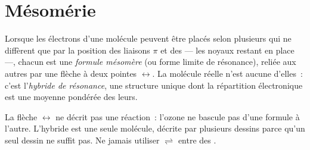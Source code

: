 \section{Mésomérie}

\begin{definition}\label{def:b1:lewis-resonance-vsepr:resonance}
Lorsque les électrons d'une molécule peuvent être placés selon plusieurs
 qui ne diffèrent que par la position des liaisons $\pi$
et des  --- les noyaux restant en place ---, chacun
est une \emph{formule
mésomère} (ou forme limite de résonance), reliée aux autres
par une flèche à deux pointes $\leftrightarrow$. La molécule réelle n'est
aucune d'elles~: c'est l'\emph{hybride de résonance}, une structure
unique dont la répartition électronique est une moyenne pondérée des
leurs.
\end{definition}

\begin{remark}\label{rem:b1:lewis-resonance-vsepr:arrow}
La flèche $\leftrightarrow$ ne décrit pas une réaction~: l'ozone ne
bascule pas d'une formule à l'autre. L'hybride est une seule molécule,
décrite par plusieurs dessins parce qu'un seul dessin ne suffit pas. Ne
jamais utiliser $\rightleftharpoons$ entre des .
\end{remark}

